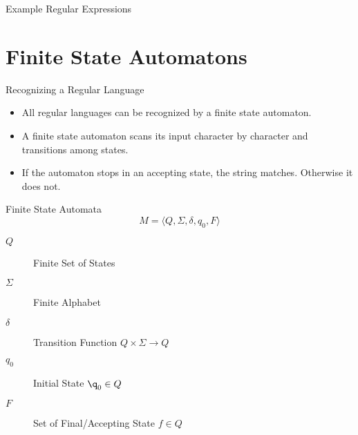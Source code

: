 \documentclass[handout]{beamer}
\newenvironment{code}{%
 \VerbatimEnvironment
 \begin{adjustbox}{max width=\textwidth, max height=0.7\textheight}
 \begin{BVerbatim}
  }{
  \end{BVerbatim}
 \end{adjustbox}
}
\begin{document}
\begin{frame}[fragile]{Example Regular Expressions}
\end{frame}


\section {Finite State Automatons}
\begin{frame}{Recognizing a Regular Language}
    \begin{itemize}
        \item All regular languages can be recognized by a finite state automaton.
        \item A finite state automaton scans its input character by character and transitions among states.
        \item If the automaton stops in an accepting state, the string matches. Otherwise it does not. 
    \end{itemize}
\end{frame}


\begin{frame}{Finite State Automata}
\[
M = \langle Q, \Sigma, \delta, q_0, F\rangle
\]
\begin{description}
\item[$Q$] Finite Set of States
\item[$\Sigma$] Finite Alphabet
\item[$\delta$] Transition Function $Q \times \Sigma \rightarrow Q$ 
\item[$q_0$] Initial State $\q_0 \in Q$
\item[$F$] Set of Final/Accepting State $f\in Q$
\end{description}
\end{frame}
\end{document}

